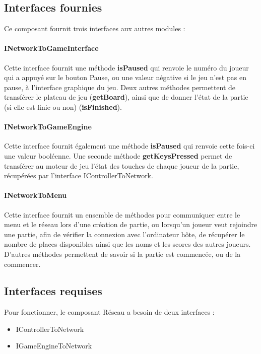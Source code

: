 \subsection{Interfaces fournies}

Ce composant fournit trois interfaces aux autres modules :

\paragraph{INetworkToGameInterface}

Cette interface fournit une méthode \textbf{isPaused} qui renvoie le numéro du joueur qui a appuyé sur le bouton Pause, ou une valeur négative si le jeu n'est pas en pause, à l'interface graphique du jeu. Deux autres méthodes permettent de transférer le plateau de jeu (\textbf{getBoard}), ainsi que de donner l'état de la partie (si elle est finie ou non) (\textbf{isFinished}).

\paragraph{INetworkToGameEngine}

Cette interface fournit également une méthode \textbf{isPaused} qui renvoie cette fois-ci une valeur booléenne. Une seconde méthode \textbf{getKeysPressed} permet de transférer au moteur de jeu l'état des touches de chaque joueur de la partie, récupérées par l'interface IControllerToNetwork.

\paragraph{INetworkToMenu}

Cette interface fournit un ensemble de méthodes pour communiquer entre le menu et le réseau lors d'une création de partie, ou lorsqu'un joueur veut rejoindre une partie, afin de vérifier la connexion avec l'ordinateur hôte, de récupérer le nombre de places disponibles ainsi que les noms et les scores des autres joueurs. D'autres méthodes permettent de savoir si la partie est commencée, ou de la commencer.

\subsection{Interfaces requises}

Pour fonctionner, le composant Réseau a besoin de deux interfaces :
\begin{itemize}
    \item IControllerToNetwork
    \item IGameEngineToNetwork 
\end{itemize}

